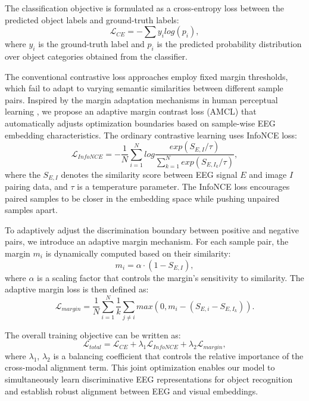 \documentclass[sigconf]{acmart}
\begin{document}
The classification objective is formulated as a cross-entropy loss between the predicted object labels and ground-truth labels:
\begin{equation}
\mathcal{L}_{CE} = -\sum y_i log(p_i),
\end{equation}
where $y_i$ is the ground-truth label and $p_i$ is the predicted probability distribution over object categories obtained from the classifier.

The conventional contrastive loss approaches employ fixed margin thresholds, which fail to adapt to varying semantic similarities between different sample pairs. Inspired by the margin adaptation mechanisms in human perceptual learning \cite{dosher1998perceptual}, we propose an adaptive margin contrast loss (AMCL) that automatically adjusts optimization boundaries based on sample-wise EEG embedding characteristics. The ordinary contrastive learning uses InfoNCE loss\cite{oord2018representation}:
\begin{equation}
\mathcal{L}_{InfoNCE} = -\frac{1}{N}\sum_{i=1}^N log \frac{exp(S_{E,I}/\tau)}{\sum_{k=1}^N exp(S_{E,I_k}/\tau)}, 
\end{equation}
where the $S_{E,I}$ denotes the similarity score between EEG signal $E$ and image $I$ pairing data, and $\tau$ is a temperature parameter. The InfoNCE loss encourages paired samples to be closer in the embedding space while pushing unpaired samples apart.

To adaptively adjust the discrimination boundary between positive and negative pairs, we introduce an adaptive margin mechanism. For each sample pair, the margin $m_i$ is dynamically computed based on their similarity:
\begin{equation}
m_i = \alpha \cdot (1 - S_{E,I}),
\end{equation}
where $\alpha$ is a scaling factor that controls the margin's sensitivity to similarity. The adaptive margin loss is then defined as:
\begin{equation}
\mathcal{L}_{margin} = \frac{1}{N}\sum_{i=1}^N \frac{1}{k}\sum_{j\neq i} max(0, m_i - (S_{E,i} - S_{E,I_k})).
\end{equation}

The overall training objective can be written as:
\begin{equation}
\mathcal{L}_{total} = \mathcal{L}_{CE} + \lambda_1\mathcal{L}_{InfoNCE} + \lambda_2\mathcal{L}_{margin},
\end{equation}
where $\lambda_1$, $\lambda_2$ is a balancing coefficient that controls the relative importance of the cross-modal alignment term. This joint optimization enables our model to simultaneously learn discriminative EEG representations for object recognition and establish robust alignment between EEG and visual embeddings.
\end{document}
